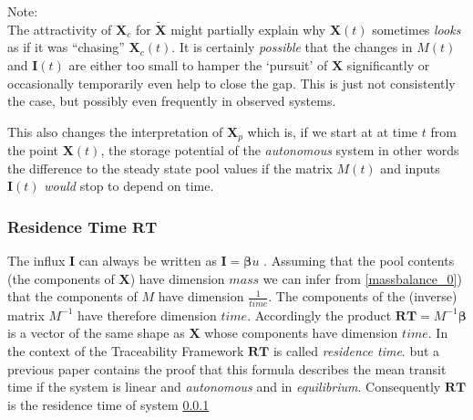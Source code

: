 \documentclass[journal abbreviation, manuscript]{copernicus}
\theoremstyle{definition}
\newcommand{\X}{\mathbf{X}}
\newcommand{\I}{\mathbf{I}}
\newcommand{\RT}{\mathbf{RT}}
\newcommand{\bv}{\bm{\beta}}
\begin{document}
Note: \\
The attractivity of $\X_c$ for $\tilde{\X}$ might partially explain why $\X(t)$ sometimes \emph{looks} as if it was ``chasing'' $\X_c(t)$.
It is certainly \emph{possible} that the changes in $M(t)$ and $\I(t)$ are either too small to hamper the `pursuit' of $\X$ significantly or occasionally temporarily even help to close the gap.
This is just not consistently the case, but possibly even frequently in observed systems.


This also changes the interpretation of $\X_p$ which is, if we start at at time $t$ from the point $\X(t)$, the storage potential of the \emph{autonomous} system in other words the difference to the steady state pool values if the matrix $M(t)$ and inputs $\I(t)$ \emph{would} stop to depend on time.


\subsubsection{Residence Time $\RT$}
The influx $\I$ can always be written as $\I=\bv u$ .
Assuming that the pool contents (the components of $\X$)  have dimension $mass$ we can infer from \eqref{massbalance_0}) that the components of $M$ have dimension $\frac{1}{time}$.
The components of the (inverse) matrix $M^{-1}$ have therefore dimension $time$. Accordingly the product $\RT= M^{-1} \bv$ is a vector of the same shape as $\X$  whose components have dimension $time$.
In the context of the Traceability Framework $\RT$ is called {\it residence time}.
but a previous paper \citep[Proposition 1]{Rasmussen2016JMB} contains the proof that this formula describes the mean transit time if the system is linear and \emph{autonomous} and in \emph{equilibrium}.  Consequently $\RT$is the residence time of system \ref{} 
\end{document}

